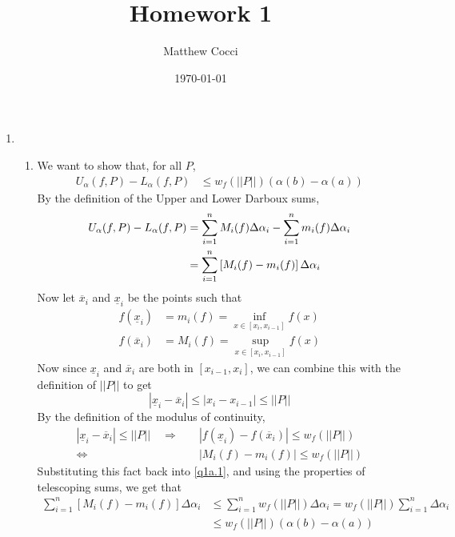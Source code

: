 \documentclass[12pt]{article}
\author{Matthew Cocci}
\title{\textbf{Homework 1}}
\date{\today}
\theoremstyle{plain}
\theoremstyle{definition}
\theoremstyle{remark}
\begin{document}
\maketitle


\begin{enumerate}

\item 
    \begin{enumerate}
        \item We want to show that, for all $P$, 
        \begin{align*}
            U_\alpha(f, P) - L_\alpha(f,P) &\leq 
                w_f\left(||P||\right) (\alpha(b) - \alpha(a)) 
        \end{align*}
        By the definition of the Upper and Lower Darboux sums,
        \begin{align}
            U_\alpha(f, P) - L_\alpha(f,P) &= 
            \sum^n_{i=1} M_i(f)\Delta\alpha_i - 
            \sum^n_{i=1} m_i(f)\Delta\alpha_i \notag \\
            &= \sum^n_{i=1} \left[M_i(f) - m_i(f)\right]
            \Delta\alpha_i \label{q1a.1}
        \end{align}
        Now let $\overline{x}_i$ and $\underline{x}_i$ be the 
        points such that 
        \begin{align*}
            f(\underline{x}_i) &= m_i(f) 
                = \inf_{x\in [x_i, x_{i-1}]} f(x)\\
            f(\overline{x}_i) &= M_i(f)
                = \sup_{x\in [x_i, x_{i-1}]} f(x)
        \end{align*}
        Now since $\underline{x}_i$ and $\overline{x}_i$ are
        both in $[x_{i-1}, x_i]$, we can combine this with
        the definition of $||P||$ to get
            \[ |\underline{x}_i - \overline{x}_i| \leq
                |x_i - x_{i-1}| \leq ||P|| \]
        By the definition of the modulus of continuity, 
        \begin{align*}
            |\underline{x}_i - \overline{x}_i| \leq
                ||P|| \quad \Rightarrow \quad
                &|f(\underline{x}_i) - f(\overline{x}_i)| 
                \leq w_f\left(||P||\right)  \\
            \Leftrightarrow \quad &|M_i(f) - m_i(f)| 
                \leq w_f\left(||P||\right)  
        \end{align*}
        Substituting this fact back into \ref{q1a.1}, and 
        using the properties of telescoping sums, we get that
        \begin{align*}
            \sum^n_{i=1} \left[M_i(f) - m_i(f)\right]
            \Delta\alpha_i 
            &\leq  \sum^n_{i=1} w_f\left(||P||\right) 
            \Delta\alpha_i = 
            w_f\left(||P||\right) \sum^n_{i=1} \Delta\alpha_i\\
            &\leq w_f\left(||P||\right) (\alpha(b)-\alpha(a)) 
        \end{align*}
                


\end{enumerate}
\end{enumerate}
\end{document}
